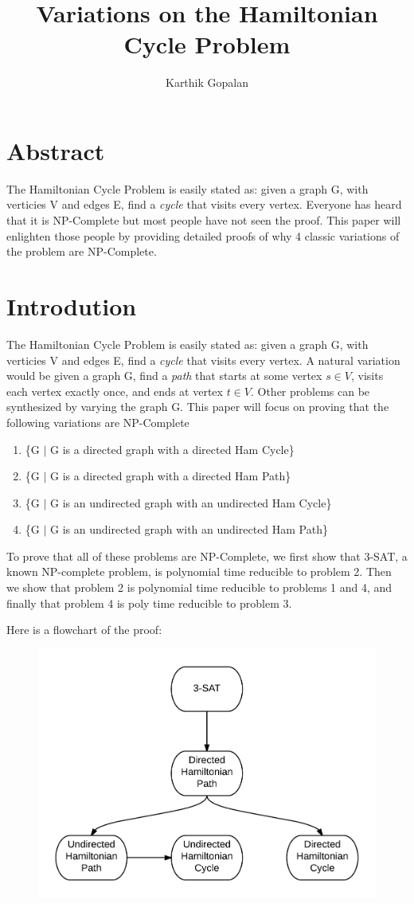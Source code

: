 \documentclass[11pt]{article}
\begin{document}
\title{Variations on the Hamiltonian Cycle Problem}
\author{Karthik Gopalan}
\maketitle

\vfill
\section{Abstract}
The Hamiltonian Cycle Problem is easily stated as: given a graph G,
with verticies V and edges E, find a \emph{cycle} that visits every vertex.
Everyone has heard that it is NP-Complete but most people have not seen the proof.
This paper will enlighten those people by providing detailed proofs of why 4 classic variations of
the problem are NP-Complete.

\section{Introdution}
The Hamiltonian Cycle Problem is easily stated as: given a graph G, 
with verticies V and edges E, find a \emph{cycle} that visits every vertex. 
A natural variation would be given a graph G, find a \emph{path} that starts at some 
vertex $s \in V$, visits each vertex exactly once, and ends at vertex $t \in V$. Other problems can be synthesized
by varying the graph G. This paper will focus on proving that the following variations are NP-Complete

\begin{enumerate}
\item \{G $|$ G is a directed graph with a directed Ham Cycle\}
\item \{G $|$ G is a directed graph with a directed Ham Path\}
\item \{G $|$ G is an undirected graph with an undirected Ham Cycle\}
\item \{G $|$ G is an undirected graph with an undirected Ham Path\}
\end{enumerate}

To prove that all of these problems are NP-Complete, we first show that 3-SAT, a known
NP-complete problem, is polynomial time reducible to problem 2. Then we show that problem
2 is polynomial time reducible to problems 1 and 4, and finally that problem 4 is poly
time reducible to problem 3.

\newpage
Here is a flowchart of the proof:
\begin{figure}[h]
\centering
\includegraphics[width=.5\textwidth]{ProofOutline.png}
\end{figure}
\end{document}
